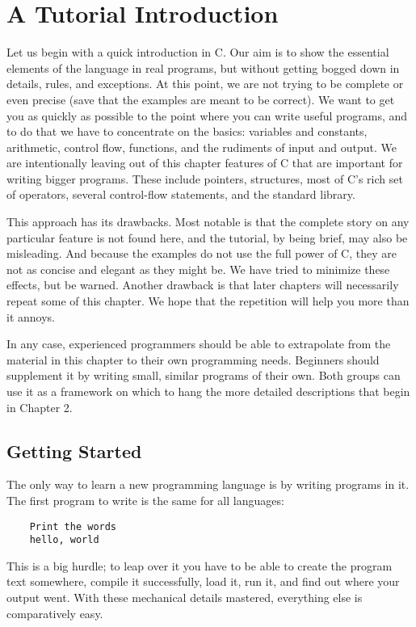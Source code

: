 

\chapter{A Tutorial Introduction}


Let us begin with a quick introduction in C. Our aim is to show the essential elements of the language in real programs, but without getting bogged down in details, rules, and exceptions.
At this point, we are not trying to be complete or even precise (save that the examples are meant to be correct).
We want to get you as quickly as possible to the point where you can write useful programs, and to do that we have to concentrate on the basics:
variables and constants, arithmetic, control flow, functions, and the rudiments of input and output.
We are intentionally leaving out of this chapter features of C that are important for writing bigger programs.
These include pointers, structures, most of C's rich set of operators, several control-flow statements, and the standard library.

This approach has its drawbacks.
Most notable is that the complete story on any particular feature is not found here, and the tutorial, by being brief, may also be misleading.
And because the examples do not use the full power of C, they are not as concise and elegant as they might be.
We have tried to minimize these effects, but be warned.
Another drawback is that later chapters will necessarily repeat some of this chapter.
We hope that the repetition will help you more than it annoys.

In any case, experienced programmers should be able to extrapolate from the material in this chapter to their own programming needs.
Beginners should supplement it by writing small, similar programs of their own.
Both groups can use it as a framework on which to hang the more detailed descriptions that begin in Chapter 2.


\section{Getting Started}

The only way to learn a new programming language is by writing programs in it.
The first program to write is the same for all languages:
\begin{lstlisting}
	Print the words
	hello, world
\end{lstlisting}
This is a big hurdle; to leap over it you have to be able to create the program text somewhere, compile it successfully, load it, run it, and find out where your output went.
With these mechanical details mastered, everything else is comparatively easy.

